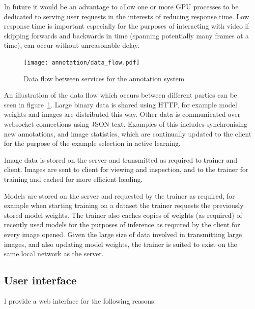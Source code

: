 In future it would be an advantage to allow one or more \gls{GPU} processes to be dedicated to serving user requests in the interests of reducing response time. Low response time is important especially for the purposes of interacting with video if skipping forwards and backwards in time (spanning potentially many frames at a time), can occur without unreasonable delay.

\begin{figure}[h!]
  \centering
  \texttt{[image: annotation/data\_flow.pdf]}
  \caption{Data flow between services for the annotation system}  
  \label{fig:data_flow}
\end{figure}

An illustration of the data flow which occurs between different parties can be seen in figure~\ref{fig:data_flow}. Large binary data is shared using \gls{HTTP}, for example model weights and images are distributed this way. Other data is communicated over websocket connections using \gls{JSON} text. Examples of this includes synchronising new annotations, and image statistics, which are continually updated to the client for the purpose of the example selection in active learning.

Image data is stored on the server and transmitted as required to trainer and client. Images are sent to client for viewing and inspection, and to the trainer for training and cached for more efficient loading. 

Models are stored on the server and requested by the trainer as required, for example when starting training on a dataset the trainer requests the previously stored model weights. The trainer also caches copies of weights (as required) of recently used models for the purposes of inference as required by the client for every image opened. Given the large size of data involved in transmitting large images, and also updating model weights, the trainer is suited to exist on the same local network as the server. 



\subsection {User interface}

I provide a web interface for the following reasons:

